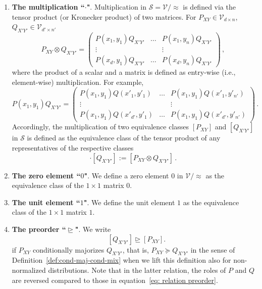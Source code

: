 \documentclass[aps,pra,11pt,onecolumn,nofootinbib,tightenlines]{revtex4-2}
\theoremstyle{definition}
\newcommand{\V}{\mathcal{V}}
\newcommand{\rgeq}{\trianglerighteq}
\begin{document}
\begin{enumerate}
\item \textbf{The multiplication ``$\cdot$"}. 
Multiplication in $\mathcal{S} = \mathcal{V}/\!\approx$ is defined via the tensor product (or Kronecker product) of two matrices. For $P_{XY} \in \V_{d \times n}$, $Q_{X'Y'} \in \V_{d' \times n'}$ 
\begin{equation}
P_{XY} \otimes Q_{X'Y'} = \begin{pmatrix}
P(x_1,y_1)Q_{X'Y'} & \hdots & P(x_1,y_n) Q_{X'Y'} \\
\vdots &  & \vdots \\
P(x_d,y_1) Q_{X'Y'} & \hdots & P(x_d,y_n) Q_{X'Y'} 
\end{pmatrix} \,,
\end{equation}
where the product of a scalar and a matrix is defined as entry-wise (i.e., element-wise) multiplication. For example,
\begin{equation}
P(x_1,y_1)Q_{X'Y'} = \begin{pmatrix}
P(x_1,y_1)Q(x'_1,y'_1) & \hdots & P(x_1,y_1) Q(x'_1,y'_{n'}) \\
\vdots &  & \vdots \\
P(x_1,y_1) Q(x'_{d'},y'_1) & \hdots & P(x_1,y_1) Q(x'_{d'},y'_{n'}) 
\end{pmatrix} \,.
\end{equation}
Accordingly, the multiplication of two equivalence classes $[P_{XY}]$ and $[Q_{X'Y'}]$ in $\mathcal{S}$ is defined as the equivalence class of the tensor product of any representatives of the respective classes
\begin{equation}
    [P_{XY}] \cdot [Q_{X'Y'}] := [P_{XY} \otimes Q_{X'Y'}] \,.
\end{equation}

\item \textbf{The zero element ``$0$"}. We define a zero element $0$ in $\V/\!\approx$ as the equivalence class of the $1\times 1$ matrix $0$.

\item \textbf{The unit element ``$1$"}.  We define the unit element $1$ as the equivalence class of the $1\times 1$ matrix $1$.

\item \textbf{The preorder ``$\rgeq$"}. 
\label{item: preorder}
We write
\begin{equation}
\label{eq: relation preorder}
\quad[Q_{X'Y'}]\rgeq[P_{XY}].
\end{equation}
if $P_{XY}$ conditionally majorizes $Q_{X'Y'}$, that is, $P_{XY} \succeq Q_{X'Y'}$ in the sense of Definition~\ref{def:cond-maj-cond-mix} when we lift this definition also for non-normalized distributions. Note that in the latter relation, the roles of $P$ and $Q$ are reversed compared to those in equation~\eqref{eq: relation preorder}.
\end{enumerate}
\end{document}

